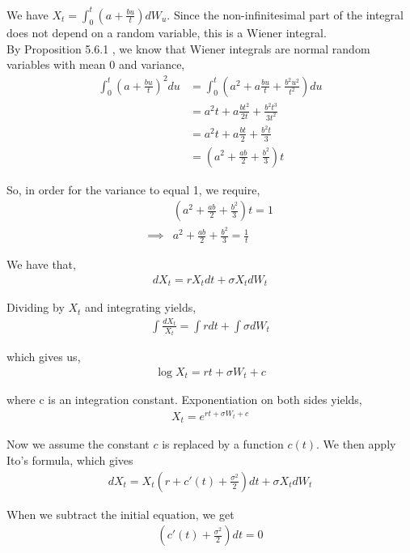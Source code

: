 \documentclass[12pt]{article}
\newenvironment{problem}[2][Problem]{\begin{trivlist}
\item[\hskip \labelsep {\bfseries #1}\hskip \labelsep {\bfseries #2.}]}{\end{trivlist}}
\begin{document}
We have $X_t = \int_0^t (a+\frac{bu}{t}) dW_u$. Since the non-infinitesimal part of the integral does not depend on a random variable, this is a Wiener integral.\\

By Proposition 5.6.1 , we know that Wiener integrals are normal random variables with mean 0 and variance,
\begin{align*}
\int_0^t (a+\frac{bu}{t})^2du &= \int_0^t (a^2 + a\frac{bu}{t} + \frac{b^2u^2}{t^2}) du\\
&= a^2t + a\frac{bt^2}{2t} + \frac{b^2t^3}{3t^2}\\
&= a^2t + a\frac{bt}{2} + \frac{b^2t}{3}\\
&= (a^2 + \frac{ab}{2} + \frac{b^2}{3})t
\end{align*}

So, in order for the variance to equal 1, we require,
\begin{align*}
&(a^2 + \frac{ab}{2} + \frac{b^2}{3})t = 1\\
\implies &a^2 + \frac{ab}{2} + \frac{b^2}{3} = \frac{1}{t}
\end{align*}

\begin{problem}{17}
\end{problem}

We have that,
\begin{align*}
dX_t = rX_tdt + \sigma X_tdW_t
\end{align*}

Dividing by $X_t$ and integrating yields,
\begin{align}
\int \frac{dX_t}{X_t} = \int rdt + \int \sigma dW_t
\end{align}

which gives us,
\begin{align*}
\log X_t = rt + \sigma W_t + c
\end{align*}

where c is an integration constant. Exponentiation on both sides yields,
\begin{align*}
X_t = e^{rt + \sigma W_t + c}
\end{align*}

Now we assume the constant $c$ is replaced by a function $c(t)$. We then apply Ito's formula, which gives
\begin{align*}
dX_t = X_t(r + c'(t) + \frac{\sigma^2}{2})dt + \sigma X_t dW_t
\end{align*}

When we subtract the initial equation, we get
\begin{align*}
(c'(t) + \frac{\sigma^2}{2})dt = 0
\end{align*}
\end{document}
